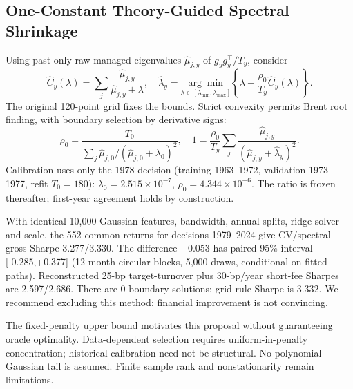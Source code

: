 \subsection{One-Constant Theory-Guided Spectral Shrinkage}
\label{app:one_constant_spectral}
Using past-only raw managed eigenvalues $\widehat\mu_{j,y}$ of
$g_yg_y^\top/T_y$, consider
\begin{equation}
 \widehat C_y(\lambda)=\sum_j\frac{\widehat\mu_{j,y}}{\widehat\mu_{j,y}+\lambda},\quad
 \widehat\lambda_y=\underset{\lambda\in[\lambda_{\min},\lambda_{\max}]}{\arg\min}
 \left\{\lambda+\frac{\rho_0}{T_y}\widehat C_y(\lambda)\right\}.
\end{equation}
The original 120-point grid fixes the bounds. Strict convexity permits
Brent root finding, with boundary selection by derivative signs:
\begin{equation}
 \rho_0=\frac{T_0}{\sum_j\widehat\mu_{j,0}/(\widehat\mu_{j,0}+\lambda_0)^2},\quad
 1=\frac{\rho_0}{T_y}\sum_j\frac{\widehat\mu_{j,y}}{(\widehat\mu_{j,y}+\widehat\lambda_y)^2}.
\end{equation}
Calibration uses only the 1978 decision (training 1963--1972, validation
1973--1977, refit $T_0=180$): $\lambda_0=2.515\times10^{-7}$, $\rho_0=4.344\times10^{-6}$.
The ratio is frozen thereafter; first-year agreement holds by construction.

With identical 10,000 Gaussian features, bandwidth, annual splits, ridge
solver and scale, the 552 common returns for decisions 1979--2024 give
CV/spectral gross Sharpe 3.277/3.330. The difference +0.053 has paired
95\% interval [-0.285,+0.377] (12-month circular blocks, 5,000 draws,
conditional on fitted paths). Reconstructed 25-bp target-turnover plus 30-bp/year short-fee Sharpes are 2.597/2.686.
There are 0 boundary solutions; grid-rule Sharpe is 3.332. We recommend excluding this method: financial improvement is not convincing.

The fixed-penalty upper bound motivates this proposal without guaranteeing
oracle optimality. Data-dependent selection requires uniform-in-penalty
concentration; historical calibration need not be structural. No polynomial
Gaussian tail is assumed. Finite sample rank and nonstationarity remain limitations.

